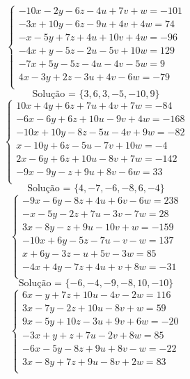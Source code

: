 \documentclass[12pt,oneside,a4paper]{article}
\begin{document}
\vspace{\baselineskip}
\begin{equation*}
\begin{cases}
-10x-2y-6z-4u+7v+w=-101 \\
-3x+10y-6z-9u+4v+4w=74 \\
-x-5y+7z+4u+10v+4w=-96 \\
-4x+y-5z-2u-5v+10w=129 \\
-7x+5y-5z-4u-4v-5w=9 \\
4x-3y+2z-3u+4v-6w=-79 \\
\end{cases}
\end{equation*}
\begin{equation*}
\text{Solução = }\{3,6,3,-5,-10,9\}
\end{equation*}
\vspace{\baselineskip}
\begin{equation*}
\begin{cases}
10x+4y+6z+7u+4v+7w=-84 \\
-6x-6y+6z+10u-9v+4w=-168 \\
-10x+10y-8z-5u-4v+9w=-82 \\
x-10y+6z-5u-7v+10w=-4 \\
2x-6y+6z+10u-8v+7w=-142 \\
-9x-9y-z+9u+8v-6w=33 \\
\end{cases}
\end{equation*}
\begin{equation*}
\text{Solução = }\{4,-7,-6,-8,6,-4\}
\end{equation*}
\vspace{\baselineskip}
\begin{equation*}
\begin{cases}
-9x-6y-8z+4u+6v-6w=238 \\
-x-5y-2z+7u-3v-7w=28 \\
3x-8y-z+9u-10v+w=-159 \\
-10x+6y-5z-7u-v-w=137 \\
x+6y-3z-u+5v-3w=85 \\
-4x+4y-7z+4u+v+8w=-31 \\
\end{cases}
\end{equation*}
\begin{equation*}
\text{Solução = }\{-6,-4,-9,-8,10,-10\}
\end{equation*}
\vspace{\baselineskip}
\begin{equation*}
\begin{cases}
6x-y+7z+10u-4v-2w=116 \\
3x-7y-2z+10u-8v+w=59 \\
9x-5y+10z-3u+9v+6w=-20 \\
-3x+y+z+7u-2v+8w=85 \\
-6x-5y-8z+9u+8v-w=-22 \\
3x-8y+7z+9u-8v+2w=83 \\
\end{cases}
\end{equation*}
\end{document}
